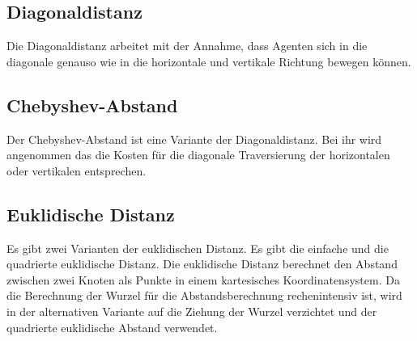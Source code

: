 \subsection{Diagonaldistanz}
Die Diagonaldistanz arbeitet mit der Annahme, dass Agenten sich in die diagonale genauso wie in die horizontale und vertikale Richtung bewegen können. 
\subsection{Chebyshev-Abstand}
Der Chebyshev-Abstand ist eine Variante der Diagonaldistanz. Bei ihr wird angenommen das die Kosten für die diagonale Traversierung der horizontalen oder vertikalen entsprechen. 
\subsection{Euklidische Distanz}
Es gibt zwei Varianten der euklidischen Distanz. Es gibt die einfache und die quadrierte euklidische Distanz. Die euklidische Distanz berechnet den Abstand zwischen zwei Knoten als Punkte in einem kartesisches Koordinatensystem. Da die Berechnung der Wurzel für die Abstandsberechnung rechenintensiv ist, wird in der alternativen Variante auf die Ziehung der Wurzel verzichtet und der quadrierte euklidische Abstand verwendet\cite{YouSurLuhu}.


